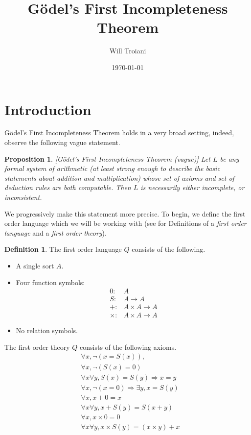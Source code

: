 \documentclass[12pt]{article}
\title{G\"{o}del's First Incompleteness Theorem}
\author{Will Troiani}
\date{\today}
\theoremstyle{plain}
\newtheorem{proposition}[thm]{Proposition}
\theoremstyle{definition}
\newtheorem{defn}[thm]{Definition} %
\newcommand{\lto}{\longrightarrow}
\begin{document}
	
	\maketitle
	\tableofcontents
	
	\section{Introduction}
	G\"{o}del's First Incompleteness Theorem holds in a very broad setting, indeed, observe the following vague statement.
	\begin{proposition}\label{prop:Godel}[G\"{o}del's First Incompleteness Theorem (vague)]
		Let $L$ be any formal system of arithmetic (at least strong enough to describe the basic statements about addition and multiplication) whose set of axioms and set of deduction rules are both computable. Then $L$ is necessarily either incomplete, or inconsistent.
	\end{proposition}
	We progressively make this statement more precise. To begin, we define the first order language which we will be working with (see \cite{first_order_logic} for Definitions of a \emph{first order language} and a \emph{first order theory}).
	\begin{defn}
		The first order language $Q$ consists of the following.
		\begin{itemize}
			\item A single sort $A$.
			\item Four function symbols:
			\begin{align*}
				0: &A\\
				S: &A \lto A\\
				+: &A \times A \lto A\\
				\times: &A \times A \lto A
			\end{align*}
			\item No relation symbols.
		\end{itemize}
		The first order theory $Q$ consists of the following axioms.
		\begin{align}
			&\forall x, \neg(x = S(x)),\\
			&\forall x, \neg(S(x) = 0)\\
			&\forall x \forall y, S(x) = S(y) \Longrightarrow x = y\\
			&\forall x, \neg(x = 0) \Longrightarrow \exists y, x = S(y)\\
			&\forall x, x + 0 = x\\
			&\forall x \forall y, x + S(y) = S(x + y)\\
			&\forall x, x \times 0 = 0\\
			&\forall x \forall y, x \times S(y) = (x \times y) + x
		\end{align}
	\end{defn}
\end{document}

